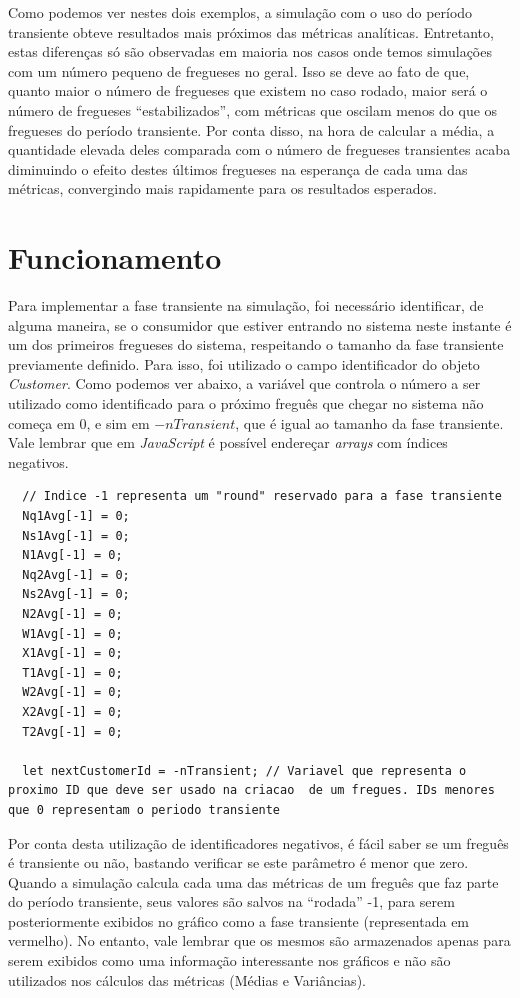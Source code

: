 \documentclass[a4paper,12pt]{report}
\begin{document}
Como podemos ver nestes dois exemplos, a simulação com o uso do período transiente obteve resultados mais próximos das métricas analíticas. Entretanto, estas diferenças só são observadas em maioria nos casos onde temos simulações com um número pequeno de fregueses no geral. Isso se deve ao fato de que, quanto maior o número de fregueses que existem no caso rodado, maior será o número de fregueses ``estabilizados'', com métricas que oscilam menos do que os fregueses do período transiente. Por conta disso, na hora de calcular a média, a quantidade elevada deles comparada com o número de fregueses transientes acaba diminuindo o efeito destes últimos fregueses na esperança de cada uma das métricas, convergindo mais rapidamente para os resultados esperados.

\section{Funcionamento}

Para implementar a fase transiente na simulação, foi necessário identificar, de alguma maneira, se o consumidor que estiver entrando no sistema neste instante é um dos primeiros fregueses do sistema, respeitando o tamanho da fase transiente previamente definido. Para isso, foi utilizado o campo identificador do objeto \emph{Customer}. Como podemos ver abaixo, a variável que controla o número a ser utilizado como identificado para o próximo freguês que chegar no sistema não começa em 0, e sim em $-nTransient$, que é igual ao tamanho da fase transiente. Vale lembrar que em \emph{JavaScript} é possível endereçar \emph{arrays} com índices negativos.

\begin{lstlisting}
  // Indice -1 representa um "round" reservado para a fase transiente
  Nq1Avg[-1] = 0;
  Ns1Avg[-1] = 0;
  N1Avg[-1] = 0;
  Nq2Avg[-1] = 0;
  Ns2Avg[-1] = 0;
  N2Avg[-1] = 0;
  W1Avg[-1] = 0;
  X1Avg[-1] = 0;
  T1Avg[-1] = 0;
  W2Avg[-1] = 0;
  X2Avg[-1] = 0;
  T2Avg[-1] = 0;

  let nextCustomerId = -nTransient; // Variavel que representa o proximo ID que deve ser usado na criacao  de um fregues. IDs menores que 0 representam o periodo transiente
\end{lstlisting}

Por conta desta utilização de identificadores negativos, é fácil saber se um freguês é transiente ou não, bastando verificar se este parâmetro é menor que zero. Quando a simulação calcula cada uma das métricas de um freguês que faz parte do período transiente, seus valores são salvos na ``rodada'' -1, para serem posteriormente exibidos no gráfico como a fase transiente (representada em vermelho). No entanto, vale lembrar que os mesmos são armazenados apenas para serem exibidos como uma informação interessante nos gráficos e não são utilizados nos cálculos das métricas (Médias e Variâncias).
\end{document}
